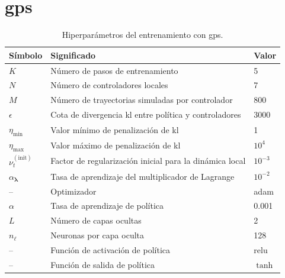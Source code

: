 \section{\acrshort{gps}}
\begin{table}[h]
\centering
\caption{Hiperparámetros del entrenamiento con \acrshort{gps}.}
\begin{tabular}{|l|l|l|}
\hline
\textbf{Símbolo} & \textbf{Significado} & \textbf{Valor} \\ \hline
$K$ & Número de pasos de entrenamiento & 5 \\ \hline
$N$ & Número de controladores locales & 7 \\ \hline
$M$ & Número de trayectorias simuladas por controlador & 800 \\ \hline
$\epsilon$ & Cota de divergencia \acrshort{kl} entre política y controladores & 3000 \\ \hline
$\eta_{\min}$ & Valor mínimo de penalización de \acrshort{kl} & 1 \\ \hline
$\eta_{\max}$ & Valor máximo de penalización de \acrshort{kl} & $10^{4}$ \\ \hline
$\nu_t^{(\text{init})}$ & Factor de regularización inicial para la dinámica local & $10^{-3}$ \\ \hline
$\alpha_{\bm\lambda}$ & Tasa de aprendizaje del multiplicador de Lagrange & $10^{-2}$ \\ \hline
– & Optimizador& \acrshort{adam} \\ \hline
$\alpha$ & Tasa de aprendizaje de política& 0.001 \\ \hline
$L$ & Número de capas ocultas & 2 \\ \hline
$n_{\ell}$ & Neuronas por capa oculta & 128 \\ \hline 
– & Función de activación de política & \acrshort{relu} \\ \hline
– & Función de salida de política & $\tanh$ \\ \hline
\end{tabular}
\end{table}

